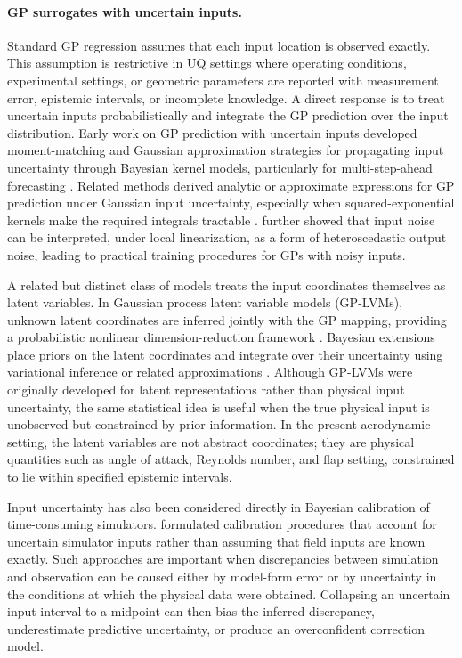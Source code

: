 \documentclass[journal]{new-aiaa}
\begin{document}
\paragraph{GP surrogates with uncertain inputs.}
Standard GP regression assumes that each input location is observed exactly. This assumption is restrictive in UQ settings where operating conditions, experimental settings, or geometric parameters are reported with measurement error, epistemic intervals, or incomplete knowledge. A direct response is to treat uncertain inputs probabilistically and integrate the GP prediction over the input distribution. Early work on GP prediction with uncertain inputs developed moment-matching and Gaussian approximation strategies for propagating input uncertainty through Bayesian kernel models, particularly for multi-step-ahead forecasting \cite{girard2003gpuncertain,quinonero2003propagation}. Related methods derived analytic or approximate expressions for GP prediction under Gaussian input uncertainty, especially when squared-exponential kernels make the required integrals tractable \cite{dallaire2009learning}.  \citet{mchutchon2011gaussian} further showed that input noise can be interpreted, under local linearization, as a form of heteroscedastic output noise, leading to practical training procedures for GPs with noisy inputs.

A related but distinct class of models treats the input coordinates themselves as latent variables. In Gaussian process latent variable models (GP-LVMs), unknown latent coordinates are inferred jointly with the GP mapping, providing a probabilistic nonlinear dimension-reduction framework \cite{lawrence2005probabilistic}. Bayesian extensions place priors on the latent coordinates and integrate over their uncertainty using variational inference or related approximations \cite{titsias2010bayesian,damianou2016variational}. Although GP-LVMs were originally developed for latent representations rather than physical input uncertainty, the same statistical idea is useful when the true physical input is unobserved but constrained by prior information. In the present aerodynamic setting, the latent variables are not abstract coordinates; they are physical quantities such as angle of attack, Reynolds number, and flap setting, constrained to lie within specified epistemic intervals.

Input uncertainty has also been considered directly in Bayesian calibration of time-consuming simulators. \citet{perrin2019taking} formulated calibration procedures that account for uncertain simulator inputs rather than assuming that field inputs are known exactly. Such approaches are important when discrepancies between simulation and observation can be caused either by model-form error or by uncertainty in the conditions at which the physical data were obtained. Collapsing an uncertain input interval to a midpoint can then bias the inferred discrepancy, underestimate predictive uncertainty, or produce an overconfident correction model.
\end{document}
